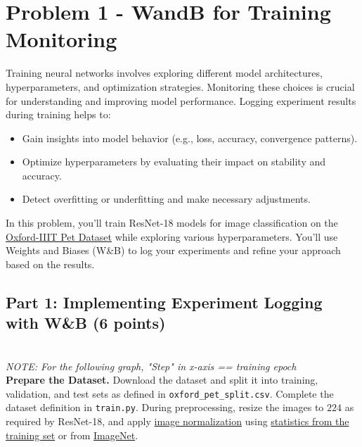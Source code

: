 \documentclass[11pt, oneside]{article}   	%
\begin{document}
\clearpage

\section*{Problem 1 - WandB for Training Monitoring}

Training neural networks involves exploring different model architectures, hyperparameters, and optimization strategies. Monitoring these choices is crucial for understanding and improving model performance. Logging experiment results during training helps to:
\begin{itemize}
    \item Gain insights into model behavior (e.g., loss, accuracy, convergence patterns).
    \item Optimize hyperparameters by evaluating their impact on stability and accuracy.
    \item Detect overfitting or underfitting and make necessary adjustments.
\end{itemize}

In this problem, you'll train ResNet-18 models for image classification on the \href{https://www.kaggle.com/datasets/tanlikesmath/the-oxfordiiit-pet-dataset?select=images}{Oxford-IIIT Pet Dataset} while exploring various hyperparameters. You’ll use Weights and Biases (W\&B) to log your experiments and refine your approach based on the results.

\subsection*{Part 1: Implementing Experiment Logging with W\&B (6 points)}
\\
\textit{NOTE: For the following graph, "Step" in x-axis == training epoch}
\\
\noindent \textbf{Prepare the Dataset.} Download the dataset and split it into training, validation, and test sets as defined in \texttt{oxford\_pet\_split.csv}. Complete the dataset definition in \texttt{train.py}. During preprocessing, resize the images to $224$ as required by ResNet-18, and apply \href{https://discuss.pytorch.org/t/understanding-transform-normalize/21730}{image normalization} using \href{https://stackoverflow.com/questions/73350133/how-to-calculate-mean-and-standard-deviation-of-a-set-of-images}{statistics from the training set} or from \href{https://stackoverflow.com/questions/58151507/why-pytorch-officially-use-mean-0-485-0-456-0-406-and-std-0-229-0-224-0-2}{ImageNet}.
\end{document}
